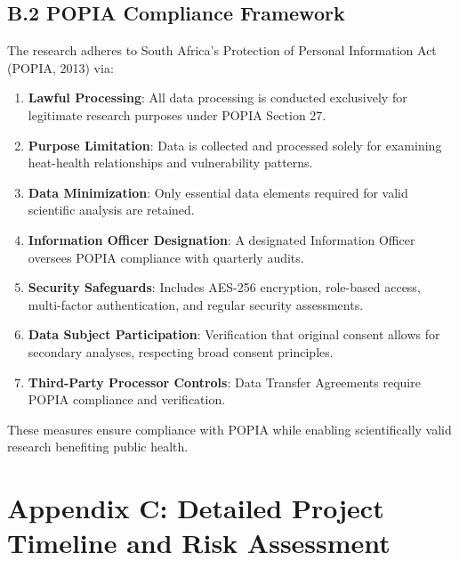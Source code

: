 \documentclass[12pt,a4paper,landscape]{article}
\begin{document}
\subsection*{B.2 POPIA Compliance Framework}

The research adheres to South Africa's Protection of Personal Information Act (POPIA, 2013) via:

\begin{enumerate}[leftmargin=*, itemsep=0.5em]
    \item \textbf{Lawful Processing}: All data processing is conducted exclusively for legitimate research purposes under POPIA Section 27.
    \item \textbf{Purpose Limitation}: Data is collected and processed solely for examining heat-health relationships and vulnerability patterns.
    \item \textbf{Data Minimization}: Only essential data elements required for valid scientific analysis are retained.
    \item \textbf{Information Officer Designation}: A designated Information Officer oversees POPIA compliance with quarterly audits.
    \item \textbf{Security Safeguards}: Includes AES-256 encryption, role-based access, multi-factor authentication, and regular security assessments.
    \item \textbf{Data Subject Participation}: Verification that original consent allows for secondary analyses, respecting broad consent principles.
    \item \textbf{Third-Party Processor Controls}: Data Transfer Agreements require POPIA compliance and verification.
\end{enumerate}

These measures ensure compliance with POPIA while enabling scientifically valid research benefiting public health.

\clearpage
\section*{Appendix C: Detailed Project Timeline and Risk Assessment}
\end{document}
